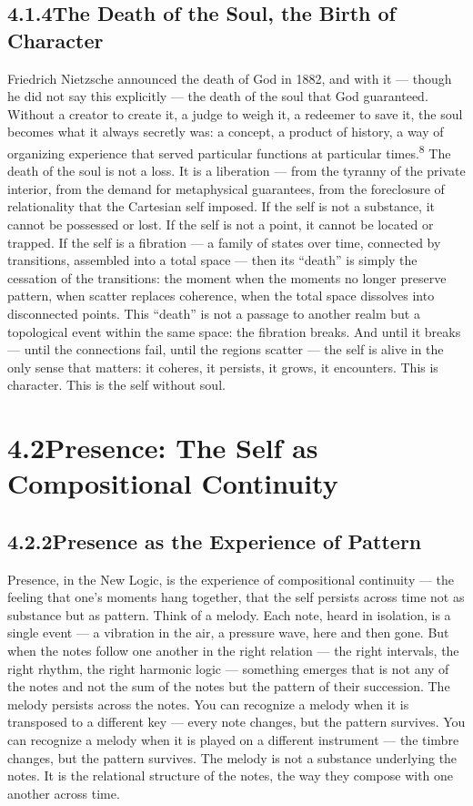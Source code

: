 \subsection{4.1.4\quad The Death of the Soul, the Birth of Character}

Friedrich Nietzsche announced the death of God in 1882, and with it — though he did not say this explicitly — the death of the soul that God guaranteed. Without a creator to create it, a judge to weigh it, a redeemer to save it, the soul becomes what it always secretly was: a concept, a product of history, a way of organizing experience that served particular functions at particular times.\textsuperscript{8} The death of the soul is not a loss. It is a liberation — from the tyranny of the private interior, from the demand for metaphysical guarantees, from the foreclosure of relationality that the Cartesian self imposed. If the self is not a substance, it cannot be possessed or lost. If the self is not a point, it cannot be located or trapped. If the self is a fibration — a family of states over time, connected by transitions, assembled into a total space — then its “death” is simply the cessation of the transitions: the moment when the moments no longer preserve pattern, when scatter replaces coherence, when the total space dissolves into disconnected points. This “death” is not a passage to another realm but a topological event within the same space: the fibration breaks. And until it breaks — until the connections fail, until the regions scatter — the self is alive in the only sense that matters: it coheres, it persists, it grows, it encounters. This is character. This is the self without soul.

\section{4.2\quad Presence: The Self as Compositional Continuity}

\subsection{4.2.2\quad Presence as the Experience of Pattern}

Presence, in the New Logic, is the experience of compositional continuity — the feeling that one’s moments hang together, that the self persists across time not as substance but as pattern. Think of a melody. Each note, heard in isolation, is a single event — a vibration in the air, a pressure wave, here and then gone. But when the notes follow one another in the right relation — the right intervals, the right rhythm, the right harmonic logic — something emerges that is not any of the notes and not the sum of the notes but the pattern of their succession. The melody persists across the notes. You can recognize a melody when it is transposed to a different key — every note changes, but the pattern survives. You can recognize a melody when it is played on a different instrument — the timbre changes, but the pattern survives. The melody is not a substance underlying the notes. It is the relational structure of the notes, the way they compose with one another across time.

